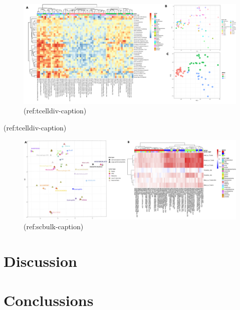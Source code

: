 \documentclass[12pt,]{book}
\theoremstyle{definition}
\theoremstyle{definition}
\theoremstyle{definition}
\theoremstyle{remark}
\begin{document}
\begin{figure}

{\centering \includegraphics[width=7.5in,angle=90]{figures-ext/TcellDiv} 

}

\caption[Analysis of T cell diversity]{(ref:tcelldiv-caption)}\label{fig:tcelldiv}
\end{figure}

(ref:tcelldiv-caption)

\begin{figure}

{\centering \includegraphics[width=7.5in,angle=90]{figures-ext/corr_sc_tcell_plot} 

}

\caption[Metagenes from single cell and bulk transcriptome]{(ref:scbulk-caption)}\label{fig:scbulk}
\end{figure}

\hypertarget{discussion}{%
\section{Discussion}\label{discussion}}

\hypertarget{conclussions}{%
\section{Conclussions}\label{conclussions}}
\end{document}
